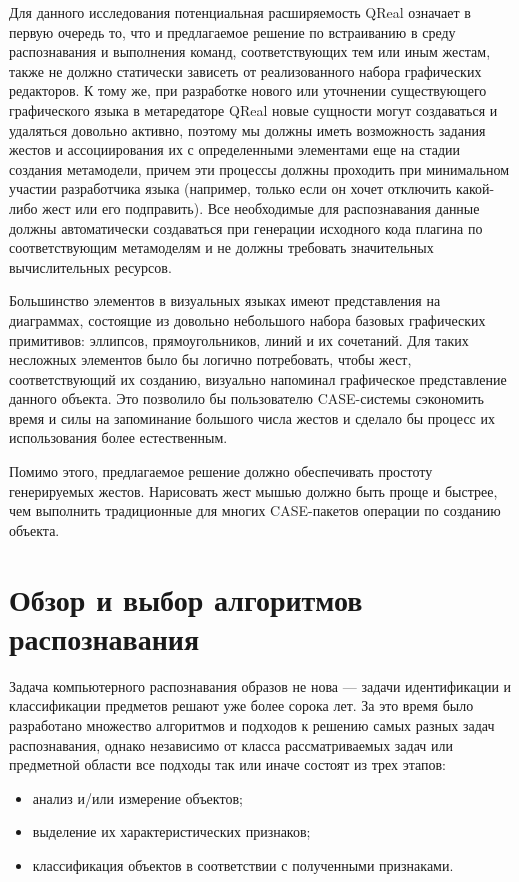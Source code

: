 \documentclass[a5paper]{article}
\begin{document}
Для данного исследования потенциальная расширяемость QReal означает в первую очередь то, что и предлагаемое решение по встраиванию в среду 
распознавания и выполнения команд, соответствующих тем или иным жестам, также не должно статически зависеть от реализованного набора графических редакторов. 
К тому же, при разработке нового или уточнении существующего графического языка в метаредаторе QReal новые сущности могут создаваться и 
удаляться довольно активно, поэтому мы должны иметь возможность задания жестов и ассоциирования их с определенными элементами еще на стадии
создания метамодели, причем эти процессы должны проходить при минимальном участии разработчика языка (например, только если он хочет 
отключить какой-либо жест или его подправить). Все необходимые для распознавания данные должны автоматически создаваться при генерации 
исходного кода плагина по соответствующим метамоделям и не должны требовать значительных вычислительных ресурсов.

Большинство элементов в визуальных языках имеют представления на диаграммах, состоящие из довольно небольшого набора базовых графических 
примитивов: эллипсов, прямоугольников, линий и их сочетаний. Для таких несложных элементов было бы логично потребовать, чтобы жест, 
соответствующий их созданию, визуально напоминал графическое представление данного объекта. Это позволило бы пользователю CASE-системы 
сэкономить время и силы на запоминание большого числа жестов и сделало бы процесс их использования более естественным. 

Помимо этого, предлагаемое решение должно обеспечивать простоту генерируемых жестов. Нарисовать жест мышью должно быть проще и быстрее, 
чем выполнить традиционные для многих CASE-пакетов операции по созданию объекта. 

\section{Обзор и выбор алгоритмов распознавания}
Задача компьютерного распознавания образов не нова --- задачи идентификации и классификации предметов решают уже более сорока лет. За это 
время было разработано множество алгоритмов и подходов к решению самых разных задач распознавания, однако независимо от класса 
рассматриваемых задач или предметной области все подходы так или иначе состоят из трех этапов: 
\begin{itemize}
  \item анализ и/или измерение объектов;
  \item выделение их характеристических признаков;
  \item классификация объектов в соответствии с полученными признаками.
\end{itemize}
\end{document}
